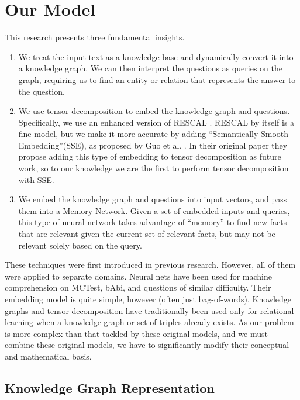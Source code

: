 \documentclass[pageno]{final_paper}
\begin{document}
\section{Our Model}
\label{Our Model}

This research presents three fundamental insights.

\begin{enumerate}

    \item We treat the input text as a knowledge base and dynamically convert it
    into a knowledge graph. We can then interpret the questions as queries on
    the graph, requiring us to find an entity or relation that represents the
    answer to the question.

    \item We use tensor decomposition to embed the knowledge graph and
    questions. Specifically, we use an enhanced version of RESCAL
    \cite{Nickel2011}. RESCAL by itself is a fine model, but we make it more
    accurate by adding ``Semantically Smooth Embedding''(SSE), as proposed by
    Guo et al. \cite{Guo2015}. In their original paper they propose adding this
    type of embedding to tensor decomposition as future work, so to our
    knowledge we are the first to perform tensor decomposition with SSE.

    \item We embed the knowledge graph and questions into input vectors, and
    pass them into a Memory Network. Given a set of embedded inputs and queries,
    this type of neural network takes advantage of ``memory'' to find new facts
    that are relevant given the current set of relevant facts, but may not be
    relevant solely based on the query.

\end{enumerate}

These techniques were first introduced in previous research. However, all of
them were applied to separate domains. Neural nets have been used for machine
comprehension on MCTest, bAbi, and questions of similar difficulty. Their
embedding model is quite simple, however (often just bag-of-words). Knowledge
graphs and tensor decomposition have traditionally been used only for relational
learning when a knowledge graph or set of triples already exists. As our problem
is more complex than that tackled by these original models, and we must combine
these original models, we have to significantly modify their conceptual and
mathematical basis.

\subsection{Knowledge Graph Representation}
\label{Knowledge Graph Representation}
\end{document}
